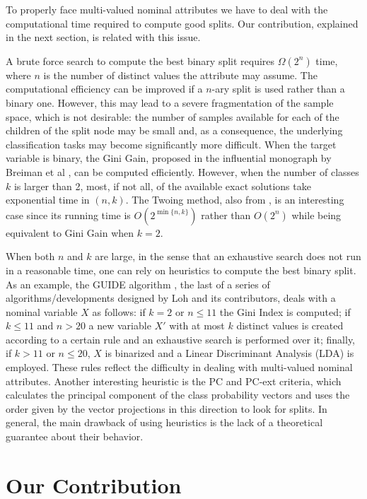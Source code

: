 To properly face  multi-valued nominal attributes we have to deal with the computational time required to compute good splits.
Our contribution, explained in the next section, is related with this issue. 
 
A brute force search to compute the best binary split 
requires $\Omega(2^n)$ time, where $n$ is the number of distinct values the attribute may assume. The computational efficiency can be improved if a $n$-ary split is used rather than a binary one. However,  this may lead to a severe fragmentation of the sample space, which is not desirable: the number of samples available for each of the children of the split node 
may be small and, as a consequence, the underlying classification tasks may become significantly more difficult.
When the target variable is binary, the Gini Gain, proposed
in the influential monograph by Breiman et al \cite{Breiman84}, can be computed efficiently.
However, when the number of classes $k$ is larger than 2,
most, if not all, of the available exact solutions take exponential time
in $(n,k)$.
The Twoing method, also from \cite{Breiman84}, 
is an  interesting case since its running time is $O(2^{\min\{n,k\}})$ rather than $O( 2^ n)$ while being equivalent to
Gini Gain when $k=2$.

When both $n$ and $k$ are large, in the sense that an exhaustive search does not run in a reasonable time, one can rely on heuristics to compute the best binary split.
As an example, the GUIDE algorithm  \cite{Loh2009}, the  last
of a series of algorithms/developments designed by Loh and its contributors, 
deals with a nominal variable $X$
as follows: if $k=2$ or $n \le 11$ the Gini Index is computed;
if $k \le 11$ and $n > 20$ a new variable $X'$ with at most $k$ distinct values is created according to a certain rule and an exhaustive search is performed over it;  finally, if $k > 11$ or $n \le 20$,  $X$ is binarized and a Linear Discriminant Analysis (LDA) is employed.
These rules reflect the difficulty in dealing with multi-valued nominal attributes. Another interesting heuristic is the PC and PC-ext criteria, which calculates the principal component of the class probability vectors and uses the order given by the vector projections in this direction to look for splits.
In general, the main drawback of using heuristics is the lack of a theoretical guarantee about their behavior. 


\section{Our Contribution}
\label{sec:contribution}

